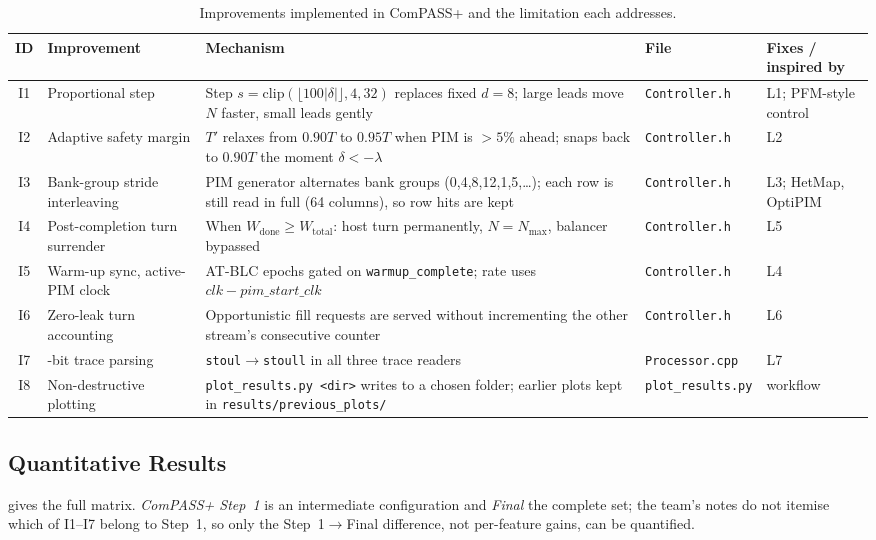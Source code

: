 \documentclass[conference]{IEEEtran}
\newcommand{\cmd}[1]{\texttt{\footnotesize #1}}
\begin{document}
\begin{table}[!tbp]
\centering
\caption{Improvements implemented in ComPASS+ and the limitation each addresses.}\label{tab:improve}
\footnotesize
\begin{tabularx}{\textwidth}{@{}c>{\raggedright\arraybackslash}p{3.3cm}>{\raggedright\arraybackslash}X>{\raggedright\arraybackslash}p{2.9cm}>{\raggedright\arraybackslash}p{2.7cm}@{}}
\toprule
\textbf{ID} & \textbf{Improvement} & \textbf{Mechanism} & \textbf{File} & \textbf{Fixes / inspired by}\\
\midrule
I1 & Proportional step & Step $s=\mathrm{clip}(\lfloor100|\delta|\rfloor,4,32)$ replaces fixed $d=8$; large leads move $N$ faster, small leads gently & \cmd{Controller.h} & L1; PFM-style control\\
I2 & Adaptive safety margin & $T'$ relaxes from $0.90T$ to $0.95T$ when PIM is $>5\%$ ahead; snaps back to $0.90T$ the moment $\delta<-\lambda$ & \cmd{Controller.h} & L2\\
I3 & Bank-group stride interleaving & PIM generator alternates bank groups (0,4,8,12,1,5,\ldots); each row is still read in full (64 columns), so row hits are kept & \cmd{Controller.h} & L3; HetMap, OptiPIM\\
I4 & Post-completion turn surrender & When $W_{\mathrm{done}}\ge W_{\mathrm{total}}$: host turn permanently, $N=N_{\max}$, balancer bypassed & \cmd{Controller.h} & L5\\
I5 & Warm-up sync, active-PIM clock & AT-BLC epochs gated on \cmd{warmup\_complete}; rate uses $\mathit{clk}-\mathit{pim\_start\_clk}$ & \cmd{Controller.h} & L4\\
I6 & Zero-leak turn accounting & Opportunistic fill requests are served without incrementing the other stream's consecutive counter & \cmd{Controller.h} & L6\\
I7 & 64-bit trace parsing & \cmd{stoul}$\to$\cmd{stoull} in all three trace readers & \cmd{Processor.cpp} & L7\\
I8 & Non-destructive plotting & \cmd{plot\_results.py <dir>} writes to a chosen folder; earlier plots kept in \cmd{results/previous\_plots/} & \cmd{plot\_results.py} & workflow\\
\bottomrule
\end{tabularx}
\end{table}

\subsection{Quantitative Results}
 gives the full matrix. \emph{ComPASS+ Step~1} is an intermediate configuration and \emph{Final} the complete set; the team's notes do not itemise which of I1--I7 belong to Step~1, so only the Step~1$\to$Final difference, not per-feature gains, can be quantified.
\end{document}
